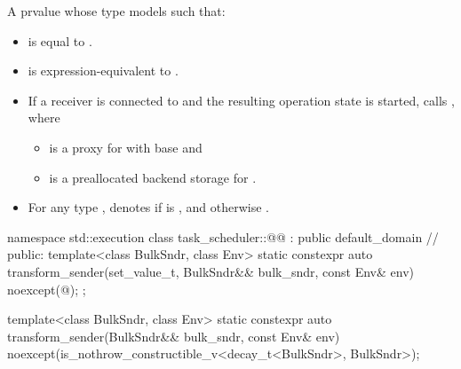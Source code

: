 \begin{itemdescr}
\pnum
\returns
A prvalue  whose type models  such that:
\begin{itemize}
\item
{}
is equal to .
\item
{}
is expression-equivalent to .
\item
If a receiver  is connected to  and
the resulting operation state is started,
calls , where
\begin{itemize}
\item
{} is a proxy for  with base
and
\item
{} is a preallocated backend storage for .
\end{itemize}
\item
For any type ,
 denotes
 if
 is , and
otherwise .
\end{itemize}
\end{itemdescr}

\begin{codeblock}
namespace std::execution {
  class task_scheduler::@@ : public default_domain {     // \expos
  public:
    template<class BulkSndr, class Env>
      static constexpr auto transform_sender(set_value_t, BulkSndr&& bulk_sndr, const Env& env)
        noexcept(@\seebelow@);
  };
}
\end{codeblock}

\begin{itemdecl}
template<class BulkSndr, class Env>
  static constexpr auto transform_sender(BulkSndr&& bulk_sndr, const Env& env)
    noexcept(is_nothrow_constructible_v<decay_t<BulkSndr>, BulkSndr>);
\end{itemdecl}

